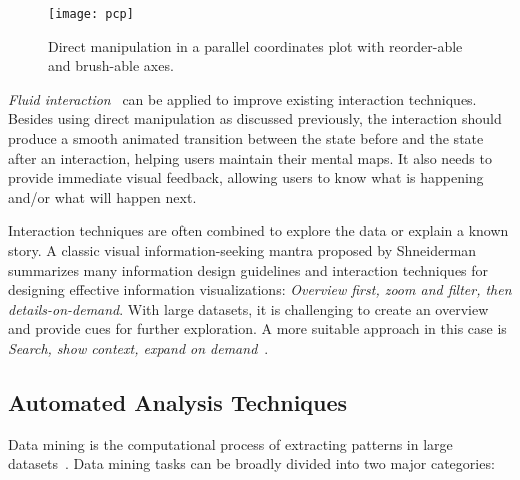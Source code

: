 \begin{figure}[!htb]
	\centering
	\texttt{[image: pcp]}
	\caption{Direct manipulation in a parallel coordinates plot with reorder-able and brush-able axes.}
	\label{fig:lr-pcp}
\end{figure}

\emph{Fluid interaction}~\cite{Elmqvist2011} can be applied to improve existing interaction techniques. Besides using direct manipulation as discussed previously, the interaction should produce a smooth animated transition between the state before and the state after an interaction, helping users maintain their mental maps. It also needs to provide immediate visual feedback, allowing users to know what is happening and/or what will happen next.

Interaction techniques are often combined to explore the data or explain a known story. A classic visual information-seeking mantra proposed by Shneiderman~\cite{Shneiderman1996} summarizes many information design guidelines and interaction techniques for designing effective information visualizations: \emph{Overview first, zoom and filter, then details-on-demand}. With large datasets, it is challenging to create an overview and provide cues for further exploration. A more suitable approach in this case is \emph{Search, show context, expand on demand}~\cite{VanHam2009}.

\subsection{Automated Analysis Techniques}
\label{sub:lr-analysis}
Data mining is the computational process of extracting patterns in large datasets~\cite{Tan2006}. Data mining tasks can be broadly divided into two major categories:

